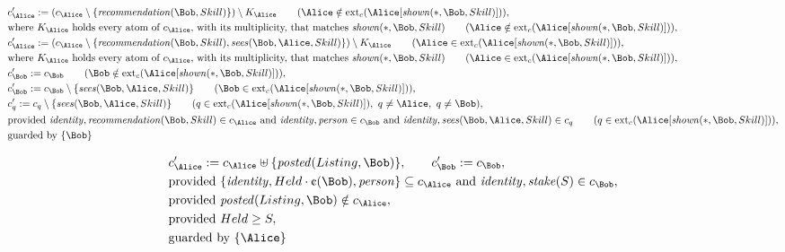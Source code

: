 \begin{align*}
&
c'_
{
\Alice
}
 := 
(c_
{
\Alice
}
 \setminus 
\{
\mathit{
recommendation
}
(
\Bob
,
Skill
)
\}
) \setminus K_
{
\Alice
}
 \qquad (
\Alice
 \notin 
\mathrm{ext}_c(
\Alice
[
\mathit{
shown
}
(
\ast
,
\Bob
,
Skill
)
]
)
)
,\\
&
\text{where } K_
{
\Alice
}
 \text{ holds every atom of } c_
{
\Alice
}
 \text{, with its multiplicity, that matches } 
\mathit{
shown
}
(
\ast
,
\Bob
,
Skill
)
 \qquad (
\Alice
 \notin 
\mathrm{ext}_c(
\Alice
[
\mathit{
shown
}
(
\ast
,
\Bob
,
Skill
)
]
)
)
,\\
&
c'_
{
\Alice
}
 := 
(c_
{
\Alice
}
 \setminus 
\{
\mathit{
recommendation
}
(
\Bob
,
Skill
)
,
\mathit{
sees
}
(
\Bob
,
\Alice
,
Skill
)
\}
) \setminus K_
{
\Alice
}
 \qquad (
\Alice
 \in 
\mathrm{ext}_c(
\Alice
[
\mathit{
shown
}
(
\ast
,
\Bob
,
Skill
)
]
)
)
,\\
&
\text{where } K_
{
\Alice
}
 \text{ holds every atom of } c_
{
\Alice
}
 \text{, with its multiplicity, that matches } 
\mathit{
shown
}
(
\ast
,
\Bob
,
Skill
)
 \qquad (
\Alice
 \in 
\mathrm{ext}_c(
\Alice
[
\mathit{
shown
}
(
\ast
,
\Bob
,
Skill
)
]
)
)
,\\
&
c'_
{
\Bob
}
 := 
c_
{
\Bob
}
 \qquad (
\Bob
 \notin 
\mathrm{ext}_c(
\Alice
[
\mathit{
shown
}
(
\ast
,
\Bob
,
Skill
)
]
)
)
,\\
&
c'_
{
\Bob
}
 := 
c_
{
\Bob
}
 \setminus 
\{
\mathit{
sees
}
(
\Bob
,
\Alice
,
Skill
)
\}
 \qquad (
\Bob
 \in 
\mathrm{ext}_c(
\Alice
[
\mathit{
shown
}
(
\ast
,
\Bob
,
Skill
)
]
)
)
,\\
&
c'_
q
 := 
c_
q
 \setminus 
\{
\mathit{
sees
}
(
\Bob
,
\Alice
,
Skill
)
\}
 \qquad (
q
 \in 
\mathrm{ext}_c(
\Alice
[
\mathit{
shown
}
(
\ast
,
\Bob
,
Skill
)
]
)
,\ 
q \neq 
\Alice
,\ 
q \neq 
\Bob
)
,\\
&
\text{provided } 
\mathit{
identity
}
,
\mathit{
recommendation
}
(
\Bob
,
Skill
)
 \in c_
{
\Alice
}
 \text{ and } 
\mathit{
identity
}
,
\mathit{
person
}
 \in c_
{
\Bob
}
 \text{ and } 
\mathit{
identity
}
,
\mathit{
sees
}
(
\Bob
,
\Alice
,
Skill
)
 \in c_
q
 \qquad (
q \in 
\mathrm{ext}_c(
\Alice
[
\mathit{
shown
}
(
\ast
,
\Bob
,
Skill
)
]
)
)
,\\
&
\text{guarded by } \{
\Bob
\}
\end{align*}

\begin{align*}
&
c'_
{
\Alice
}
 := 
c_
{
\Alice
}
 \uplus 
\{
\mathit{
posted
}
(
Listing
,
\Bob
)
\}
, \qquad 
c'_
{
\Bob
}
 := 
c_
{
\Bob
}
,\\
&
\text{provided } 
\{
\mathit{
identity
}
,
Held
\cdot
\text{\textcent}
(
\Bob
)
,
\mathit{
person
}
\}
 \subseteq c_
{
\Alice
}
 \text{ and } 
\mathit{
identity
}
,
\mathit{
stake
}
(
S
)
 \in c_
{
\Bob
}
,\\
&
\text{provided } 
\mathit{
posted
}
(
Listing
,
\Bob
)
 \notin c_
{
\Alice
}
,\\
&
\text{provided } 
Held
\ge
S
,\\
&
\text{guarded by } \{
\Alice
\}
\end{align*}
